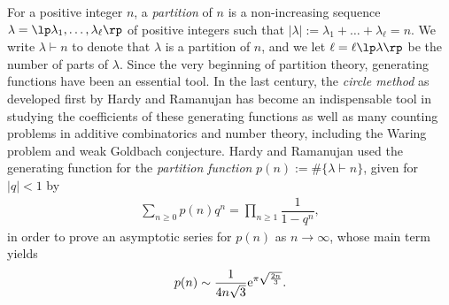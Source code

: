 For a positive integer $n$, a {\it partition} of $n$ is a non-increasing sequence $\lambda = \lp \lambda_1, \dots, \lambda_\ell \rp$ of positive integers such that $|\lambda| := \lambda_1 + \dots + \lambda_\ell = n$. We write $\lambda \vdash n$ to denote that $\lambda$ is a partition of $n$, and we let $\ell = \ell\lp \lambda \rp$ be the number of parts of $\lambda$. Since the very beginning of partition theory, generating functions have been an essential tool. In the last century, the {\it circle method}
as developed first by Hardy and Ramanujan \cite{HR} has become an indispensable tool in studying the coefficients of these generating functions as well as many counting problems in additive combinatorics and number theory, including the Waring problem and weak Goldbach conjecture. Hardy and Ramanujan used the generating function for the {\it partition function} $p(n) := \#\{ \lambda \vdash n \}$, given for $|q|<1$ by
\begin{align*}
 \sum_{n \geq 0} p(n) q^n = \prod_{n \geq 1} \dfrac{1}{1 - q^n},
\end{align*}
in order to prove an asymptotic series for $p(n)$ as $n \to \infty$, whose main term yields
\begin{align*}
 p(n) \sim \dfrac{1}{4n\sqrt{3}} {\rm e}^{\pi\sqrt{\frac{2n}{3}}}.
\end{align*}

